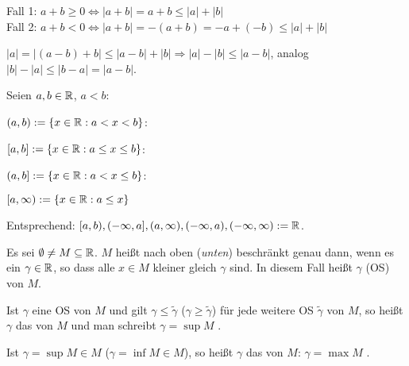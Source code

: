 \documentclass[a4paper,oneside,DIV15,BCOR12mm]{scrbook}
\begin{document}
\begin{beweise}
\setcounter{enumi}{4}
\item Fall 1: $a+b \ge 0 \Leftrightarrow |a+b| = a+b \le |a| + |b|$ \\
Fall 2: $a+b  <  0 \Leftrightarrow |a+b| = -(a+b) = - a + (-b) \le |a| + |b|$ \\
\item $|a| = |(a-b) + b| \le |a-b| + |b| \Rightarrow |a| - |b| \le |a-b|$, analog $|b|-|a| \le |b-a| = |a-b|$.
\end{beweise}

\begin{definition}[Intervall]
Seien $a,b \in \mathbb{R}$, $a<b$:

\begin{liste}
\item $(a,b) := \{ x \in \mathbb{R}: a < x < b\} $: 
\item $[a,b] := \{ x \in \mathbb{R}: a \le x \le b\} $: 
\item $(a,b] := \{ x \in \mathbb{R}: a < x \le b\} $: 
\item $[a, \infty) := \{ x \in \mathbb{R}: a \le x \}$
\end{liste}

Entsprechend: $[a,b), (-\infty, a], (a, \infty), (-\infty, a), (-\infty, \infty) := \mathbb{R}$.
\end{definition}

\begin{definition}

Es sei $\emptyset \ne M \subseteq \mathbb{R}$. $M$ heißt nach oben (\textit{unten}) beschränkt genau dann, wenn es ein $\gamma \in \mathbb{R}$, so dass alle $x \in M$ kleiner gleich  $\gamma$ sind. In diesem Fall heißt $\gamma$  (OS)  von $M$.

Ist $\gamma$ eine OS  von $M$ und gilt $\gamma \le \tilde\gamma$ ($\gamma \ge \tilde\gamma$) für jede weitere OS  $\tilde\gamma$ von $M$, so heißt $\gamma$ das   von $M$ und man schreibt $\gamma = \sup{M}$ .

Ist $\gamma = \sup{M} \in M$ ($\gamma = \inf{M} \in M$), so heißt $\gamma$ das   von $M$: $\gamma = \max{M}$ .
\end{definition}
\end{document}
